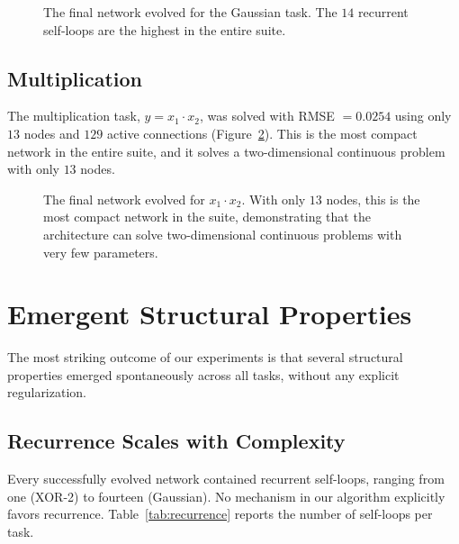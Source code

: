 \begin{figure}[h]
  \centering
  \caption{The final network evolved for the Gaussian task. The $14$
    recurrent self-loops are the highest in the entire suite.}
  \label{fig:gaussian-spring}
\end{figure}

\subsection{Multiplication}
\label{sec:results-multiply}

The multiplication task, $y = x_1 \cdot x_2$, was solved with
RMSE $= 0.0254$ using only $13$ nodes and $129$ active connections
(Figure~\ref{fig:multiply-spring}). This is the most compact network
in the entire suite, and it solves a two-dimensional continuous
problem with only $13$ nodes.

\begin{figure}[h]
  \centering
  \caption{The final network evolved for $x_1 \cdot x_2$. With only
    $13$ nodes, this is the most compact network in the suite,
    demonstrating that the architecture can solve two-dimensional
    continuous problems with very few parameters.}
  \label{fig:multiply-spring}
\end{figure}

\section{Emergent Structural Properties}
\label{sec:results-emergent}

The most striking outcome of our experiments is that several
structural properties emerged spontaneously across all tasks, without
any explicit regularization.

\subsection{Recurrence Scales with Complexity}
\label{sec:results-recurrence}

Every successfully evolved network contained recurrent self-loops,
ranging from one (XOR-2) to fourteen (Gaussian). No mechanism in our
algorithm explicitly favors recurrence. Table~\ref{tab:recurrence}
reports the number of self-loops per task.

